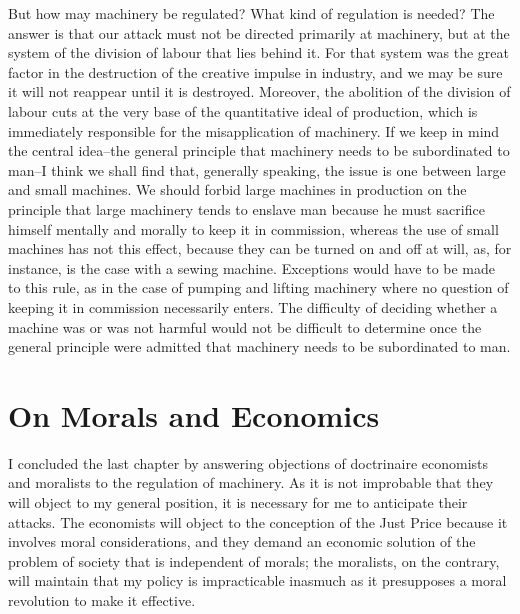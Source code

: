 \documentclass{book}
\begin{document}
But how may machinery be regulated? What kind of regulation is needed? The answer is that our attack must not be directed primarily at machinery, but at the system of the division of labour that lies behind it. For that system was the great factor in the destruction of the creative impulse in industry, and we may be sure it will not reappear until it is destroyed. Moreover, the abolition of the division of labour cuts at the very base of the quantitative ideal of production, which is immediately responsible for the misapplication of machinery. If we keep in mind the central idea–the general principle that machinery needs to be subordinated to man–I think we shall find that, generally speaking, the issue is one between large and small machines. We should forbid large machines in production on the principle that large machinery tends to enslave man because he must sacrifice himself mentally and morally to keep it in commission, whereas the use of small machines has not this effect, because they can be turned on and off at will, as, for instance, is the case with a sewing machine. Exceptions would have to be made to this rule, as in the case of pumping and lifting machinery where no question of keeping it in commission necessarily enters. The difficulty of deciding whether a machine was or was not harmful would not be difficult to determine once the general principle were admitted that machinery needs to be subordinated to man.

\chapter{On Morals and Economics}
\label{chapter-11}
I concluded the last chapter by answering objections of doctrinaire economists and moralists to the regulation of machinery. As it is not improbable that they will object to my general position, it is necessary for me to anticipate their attacks. The economists will object to the conception of the Just Price because it involves moral considerations, and they demand an economic solution of the problem of society that is independent of morals; the moralists, on the contrary, will maintain that my policy is impracticable inasmuch as it presupposes a moral revolution to make it effective.
\end{document}
